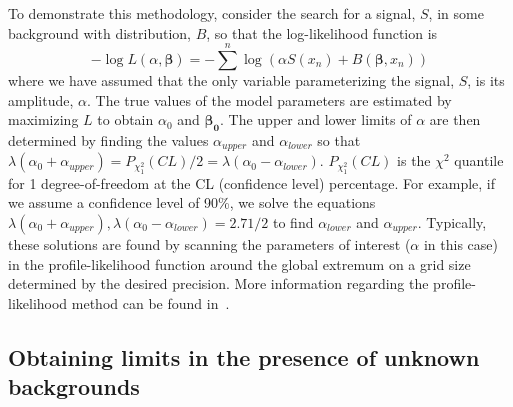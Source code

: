 To demonstrate this methodology, consider the search for a signal, $S$, in some background with distribution, $B$, so that the log-likelihood function is
		\[
		-\log L (\alpha, \boldsymbol{\beta}) = -\sum^{n} \log (\alpha S (x_{n}) + B(\boldsymbol{\beta}, x_{n}))
		\]
where we have assumed that the only variable parameterizing the signal, $S$, is its amplitude, $\alpha$.  The true values of the model parameters are estimated by maximizing $L$ to obtain $\alpha_{0}$ and $\boldsymbol{\beta_{0}}$.  The upper and lower limits of $\alpha$ are then determined by finding the values $\alpha_{upper}$ and $\alpha_{lower}$ so that $\lambda(\alpha_{0} + \alpha_{upper}) =  P_{\chi^{2}_{1}} (CL)/2 = \lambda(\alpha_{0} - \alpha_{lower})$.  $P_{\chi^{2}_{1}} (CL)$ is the $\chi^{2}$ quantile for 1 degree-of-freedom at the CL (confidence level) percentage.  For example, if we assume a confidence level of 90\%, we solve the equations $\lambda(\alpha_{0} + \alpha_{upper}), \lambda(\alpha_{0} - \alpha_{lower}) = 2.71/2$ to find $\alpha_{lower}$ and $\alpha_{upper}$.  Typically, these solutions are found by scanning the parameters of interest  ($\alpha$ in this case) in the profile-likelihood function around the global extremum on a grid size determined by the desired precision.  More information regarding the profile-likelihood method can be found in~\cite{PLRefs}.

	\subsection{Obtaining limits in the presence of unknown backgrounds}
	\label{sec:LimitsUnknownBackgroundML}	
	
